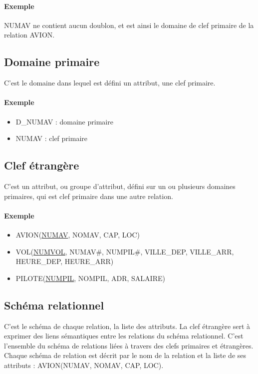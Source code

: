 \documentclass[10pt]{article}
\begin{document}
            \paragraph{Exemple}  NUMAV ne contient aucun doublon, et est ainsi le domaine de clef primaire de la relation AVION.

        \subsection{Domaine primaire}
            C'est le domaine dans lequel est défini un attribut, une clef primaire.

            \paragraph{Exemple}
                \begin{itemize}
                    \item D\_NUMAV : domaine primaire
                    \item NUMAV : clef primaire
                \end{itemize}

        \subsection{Clef étrangère}
            C'est un attribut, ou groupe d'attribut, défini sur un ou plusieurs domaines primaires, qui est clef primaire dans une autre relation.

            \paragraph{Exemple}
                \begin{itemize}
                    \item AVION(\underline{NUMAV}, NOMAV, CAP, LOC)
                    \item VOL(\underline{NUMVOL}, NUMAV\#, NUMPIL\#, VILLE\_DEP, VILLE\_ARR, HEURE\_DEP, HEURE\_ARR)
                    \item PILOTE(\underline{NUMPIL}, NOMPIL, ADR, SALAIRE)
                \end{itemize}

        \subsection{Schéma relationnel}
            C'est le schéma de chaque relation, la liste des attributs. La clef étrangère sert à exprimer des liens sémantiques entre les relations du schéma relationnel. C'est l'ensemble du schéma de relations liées à travers des clefs primaires et étrangères. Chaque schéma de relation est décrit par le nom de la relation et la liste de ses attributs : AVION(NUMAV, NOMAV, CAP, LOC).
\end{document}
